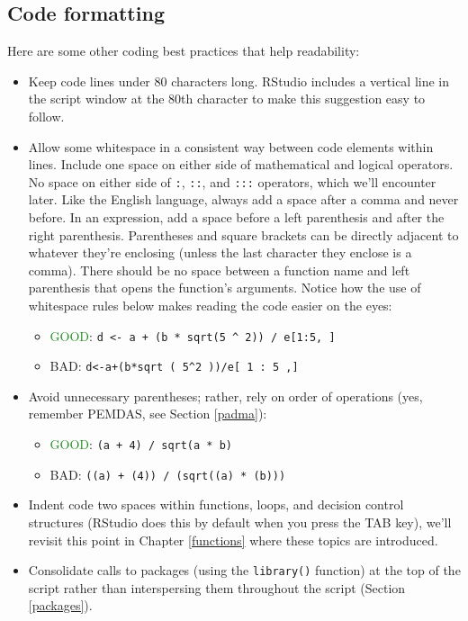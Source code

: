 \documentclass[
  11pt,
]{krantz}
\providecommand{\tightlist}{%
  \setlength{\itemsep}{0pt}\setlength{\parskip}{0pt}}
\theoremstyle{definition}
\theoremstyle{definition}
\theoremstyle{definition}
\theoremstyle{definition}
\theoremstyle{remark}
\begin{document}
\hypertarget{code-formatting}{%
\subsection{Code formatting}\label{code-formatting}}

Here are some other coding best practices that help readability:

\begin{itemize}
\tightlist
\item
  Keep code lines under 80 characters long. RStudio includes a vertical line in the script window at the 80th character to make this suggestion easy to follow.
\item
  Allow some whitespace in a consistent way between code elements within lines. Include one space on either side of mathematical and logical operators. No space on either side of \texttt{:}, \texttt{::}, and \texttt{:::} operators, which we'll encounter later. Like the English language, always add a space after a comma and never before. In an expression, add a space before a left parenthesis and after the right parenthesis. Parentheses and square brackets can be directly adjacent to whatever they're enclosing (unless the last character they enclose is a comma). There should be no space between a function name and left parenthesis that opens the function's arguments. Notice how the use of whitespace rules below makes reading the code easier on the eyes:

  \begin{itemize}
  \tightlist
  \item
    \textcolor{ForestGreen}{GOOD}: \texttt{d\ \textless{}-\ a\ +\ (b\ *\ sqrt(5\ \^{}\ 2))\ /\ e{[}1:5,\ {]}}
  \item
    \textcolor{RedOrange}{BAD}: \texttt{d\textless{}-a+(b*sqrt\ (\ 5\^{}2\ ))/e{[}\ 1\ :\ 5\ ,{]}}
  \end{itemize}
\item
  Avoid unnecessary parentheses; rather, rely on order of operations (yes, remember PEMDAS, see Section \ref{padma}):

  \begin{itemize}
  \tightlist
  \item
    \textcolor{ForestGreen}{GOOD}: \texttt{(a\ +\ 4)\ /\ sqrt(a\ *\ b)}
  \item
    \textcolor{RedOrange}{BAD}: \texttt{((a)\ +\ (4))\ /\ (sqrt((a)\ *\ (b)))}
  \end{itemize}
\item
  Indent code two spaces within functions, loops, and decision control structures (RStudio does this by default when you press the TAB key), we'll revisit this point in Chapter \ref{functions} where these topics are introduced.
\item
  Consolidate calls to packages (using the \texttt{library()} function) at the top of the script rather than interspersing them throughout the script (Section \ref{packages}).
\end{itemize}
\end{document}
